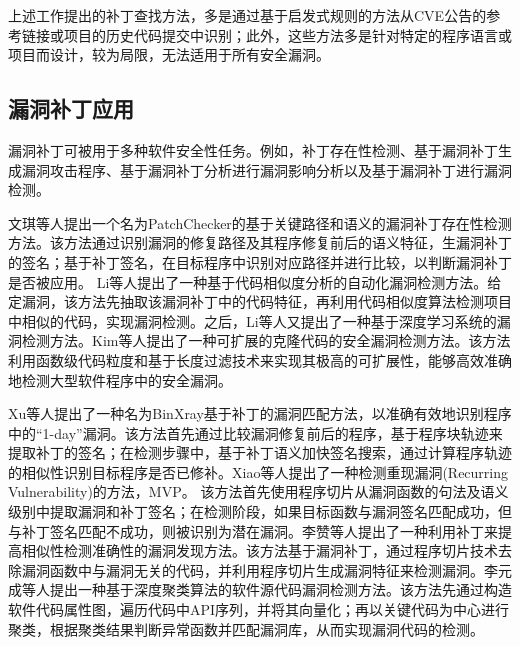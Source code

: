 上述工作提出的补丁查找方法，多是通过基于启发式规则的方法从CVE公告的参考链接或项目的历史代码提交中识别；此外，这些方法多是针对特定的程序语言或项目而设计，较为局限，无法适用于所有安全漏洞。


\subsection{漏洞补丁应用}
漏洞补丁可被用于多种软件安全性任务。例如，补丁存在性检测\cite{8文琪2020}、基于漏洞补丁生成漏洞攻击程序\cite{brumley2008automatic,you2017semfuzz}、基于漏洞补丁分析进行漏洞影响分析\cite{4李舟军2015软件安全漏洞检测技术,5李韵2020基于机器学习的软件漏洞挖掘方法综述,pashchenko2018vulnerable,ponta2020detection,pashchenko2020vuln4real,Wang2020empirical}以及基于漏洞补丁进行漏洞检测\cite{li2016vulpecker,li2018vuldeepecker,zhou2019devign,jimenez2019importance}。%

文琪等人\cite{8文琪2020}提出一个名为PatchChecker的基于关键路径和语义的漏洞补丁存在性检测方法。该方法通过识别漏洞的修复路径及其程序修复前后的语义特征，生漏洞补丁的签名；基于补丁签名，在目标程序中识别对应路径并进行比较，以判断漏洞补丁是否被应用。%
Li等人\cite{li2016vulpecker}提出了一种基于代码相似度分析的自动化漏洞检测方法。给定漏洞，该方法先抽取该漏洞补丁中的代码特征，再利用代码相似度算法检测项目中相似的代码，实现漏洞检测。之后，Li等人\cite{li2018vuldeepecker}又提出了一种基于深度学习系统的漏洞检测方法。Kim等人\cite{kim2017vuddy}提出了一种可扩展的克隆代码的安全漏洞检测方法。该方法利用函数级代码粒度和基于长度过滤技术来实现其极高的可扩展性，能够高效准确地检测大型软件程序中的安全漏洞。

Xu等人\cite{xu2020patch}提出了一种名为BinXray基于补丁的漏洞匹配方法，以准确有效地识别程序中的“1-day”漏洞。该方法首先通过比较漏洞修复前后的程序，基于程序块轨迹来提取补丁的签名；在检测步骤中，基于补丁语义加快签名搜索，通过计算程序轨迹的相似性识别目标程序是否已修补。Xiao等人\cite{xiao2020mvp}提出了一种检测重现漏洞(Recurring Vulnerability)的方法，MVP。 该方法首先使用程序切片从漏洞函数的句法及语义级别中提取漏洞和补丁签名；在检测阶段，如果目标函数与漏洞签名匹配成功，但与补丁签名匹配不成功，则被识别为潜在漏洞。李赞等人\cite{22李赞2018}提出了一种利用补丁来提高相似性检测准确性的漏洞发现方法。该方法基于漏洞补丁，通过程序切片技术去除漏洞函数中与漏洞无关的代码，并利用程序切片生成漏洞特征来检测漏洞。李元成等人\cite{23李元诚2020}提出一种基于深度聚类算法的软件源代码漏洞检测方法。该方法先通过构造软件代码属性图，遍历代码中API序列，并将其向量化；再以关键代码为中心进行聚类，根据聚类结果判断异常函数并匹配漏洞库，从而实现漏洞代码的检测。


